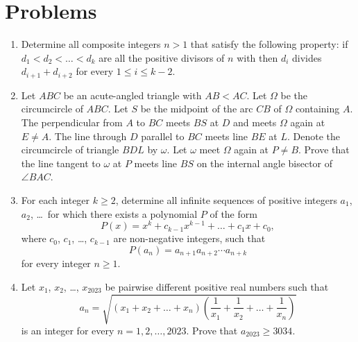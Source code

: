 \documentclass[11pt]{scrartcl}
\begin{document}
\section{Problems}
\begin{enumerate}[\bfseries 1.]
\item %
Determine all composite integers $n>1$ that satisfy the following property:
if $d_1 < d_2 < \dots < d_k$ are all the positive divisors of $n$ with
then $d_i$ divides $d_{i+1} + d_{i+2}$ for every $1 \leq i \leq k - 2$.

\item %
Let $ABC$ be an acute-angled triangle with $AB < AC$.
Let $\Omega$ be the circumcircle of $ABC$.
Let $S$ be the midpoint of the arc $CB$ of $\Omega$ containing $A$.
The perpendicular from $A$ to $BC$ meets $BS$ at $D$ and meets $\Omega$ again at $E \neq A$.
The line through $D$ parallel to $BC$ meets line $BE$ at $L$.
Denote the circumcircle of triangle $BDL$ by $\omega$.
Let $\omega$ meet $\Omega$ again at $P \neq B$.
Prove that the line tangent to $\omega$ at $P$ meets line $BS$
on the internal angle bisector of $\angle BAC$.

\item %
For each integer $k\geq 2$, determine all infinite sequences of positive integers
$a_1$, $a_2$, \dots\ for which there exists a polynomial $P$ of the form
\[ P(x)=x^k+c_{k-1}x^{k-1}+\dots + c_1 x+c_0, \]
where $c_0$, $c_1$, \dots, $c_{k-1}$ are non-negative integers, such that
\[ P(a_n)=a_{n+1}a_{n+2}\dotsm a_{n+k} \]
for every integer $n\geq 1$.

\item %
Let $x_1$, $x_2$, \dots, $x_{2023}$ be pairwise different positive real numbers such that
\[ a_n = \sqrt{(x_1+x_2+\dots+x_n)
  \left(\frac{1}{x_1}+\frac{1}{x_2}+\dots+\frac{1}{x_n}\right)} \]
is an integer for every $n=1,2,\dots,2023$. Prove that $a_{2023} \geq 3034$.


\end{enumerate}
\end{document}
